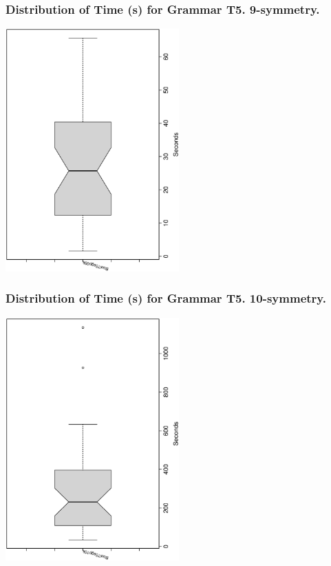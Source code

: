 \documentclass[18pt,c]{beamer}
\begin{document}
 \begin{frame}
 \frametitle{ Distribution of Time (s) for Grammar T5. 9-symmetry. }
 \begin{center}
\includegraphics[width=0.5\textwidth, angle=-90]
{ExpFboxplottSeconds007.eps}
 \end{center}
 \label{ExpFboxplottSeconds007.eps}  
 \end{frame}

 \begin{frame}
 \frametitle{ Distribution of Time (s) for Grammar T5. 10-symmetry. }
 \begin{center}
\includegraphics[width=0.5\textwidth, angle=-90]
{ExpFboxplottSeconds008.eps}
 \end{center}
 \label{ExpFboxplottSeconds008.eps}  
 \end{frame}
\end{document}
